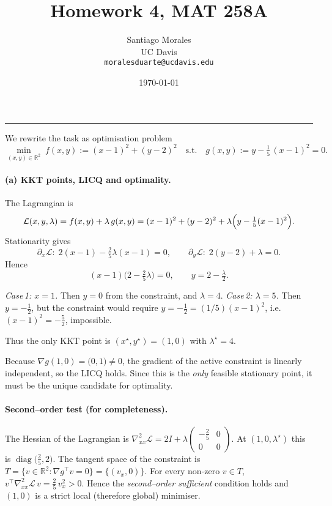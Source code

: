 \documentclass[11pt]{article}
\title{\vspace{-1cm} \textbf{Homework 4, MAT 258A}}
\author{Santiago Morales \\ UC Davis \\ \texttt{moralesduarte@ucdavis.edu}}
\date{\today}
\begin{document}
\maketitle
\vspace{-1em}
\hrule
\vspace{1em}

We rewrite the task as optimisation problem
        \[
        \min_{(x,y)\in\mathbb R^2}\;f(x,y):=(x-1)^2+(y-2)^2
        \quad\text{s.t.}\quad 
        g(x,y):=y-\tfrac15\,(x-1)^2=0 .
        \]
        
        \paragraph{(a) KKT points, LICQ and optimality.}
        The Lagrangian is
        \[
        \mathcal L(x,y,\lambda)=f(x,y)+\lambda\,g(x,y)
                           =(x-1)^2+(y-2)^2+\lambda\Bigl(y-\tfrac15(x-1)^2\Bigr).
        \]
        Stationarity gives
        \[
        \partial_x\mathcal L: \; 2(x-1)-\tfrac25\lambda(x-1)=0,
        \qquad
        \partial_y\mathcal L:\; 2(y-2)+\lambda=0 .
        \]
        Hence
        \[
        (x-1)\bigl(2-\tfrac25\lambda\bigr)=0,\qquad y=2-\tfrac{\lambda}{2}.
        \]
        
        \emph{Case 1: \(x=1\).}  
        Then \(y=0\) from the constraint, and \(\lambda=4\).  
        \emph{Case 2: \(\lambda=5\).}  
        Then \(y=-\tfrac12\), but the constraint would require \(y=-\tfrac12=(1/5)(x-1)^2\), i.e.\ \((x-1)^2=-\tfrac52\), impossible.  
        
        Thus the only KKT point is \((x^\star,y^\star)=(1,0)\) with \(\lambda^\star=4\).
        
        Because \(\nabla g(1,0)=\bigl(0,1\bigr)\neq0\), the gradient of the active constraint is linearly independent, so the LICQ holds.  Since this is the \emph{only} feasible stationary point, it must be the unique candidate for optimality.
        
        \paragraph{Second–order test (for completeness).}
        The Hessian of the Lagrangian is
        \(
        \nabla^2_{xx}\!\mathcal L=2I+\lambda
        \begin{pmatrix}-\tfrac25&0\\[2pt]0&0\end{pmatrix}.
        \)
        At \((1,0,\lambda^\star)\) this is 
        \(\operatorname{diag}\bigl(\tfrac25,2\bigr)\).
        The tangent space of the constraint is 
        \(T=\{v\in\mathbb R^2:\nabla g^\top v=0\}=\{(v_x,0)\}\).
        For every non‑zero \(v\in T\),
        \(v^\top\nabla^2_{xx}\mathcal L\,v=\tfrac25\,v_x^{2}>0\).
        Hence the \emph{second–order sufficient} condition holds and
        \((1,0)\) is a strict local (therefore global) minimiser.
        
\end{document}

